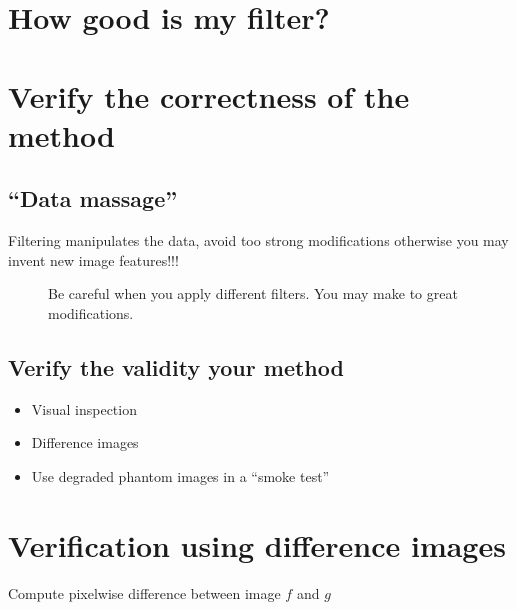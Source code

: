 \documentclass[letterpaper,10pt,english]{sphinxmanual}
\begin{document}
\section{How good is my filter?}
\label{\detokenize{02-ImageEnhancement:how-good-is-my-filter}}

\section{Verify the correctness of the method}
\label{\detokenize{02-ImageEnhancement:verify-the-correctness-of-the-method}}

\subsection{“Data massage”}
\label{\detokenize{02-ImageEnhancement:data-massage}}
\sphinxAtStartPar
Filtering manipulates the data, avoid too strong modifications otherwise you may invent new image features!!!

\begin{figure}[htbp]
\centering
\capstart

\noindent{}
\caption{Be careful when you apply different filters. You may make to great modifications.}\label{\detokenize{02-ImageEnhancement:id30}}\end{figure}




\subsection{Verify the validity your method}
\label{\detokenize{02-ImageEnhancement:verify-the-validity-your-method}}\begin{itemize}
\item {} 
\sphinxAtStartPar
Visual inspection

\item {} 
\sphinxAtStartPar
Difference images

\item {} 
\sphinxAtStartPar
Use degraded phantom images in a “smoke test”

\end{itemize}


\section{Verification using difference images}
\label{\detokenize{02-ImageEnhancement:verification-using-difference-images}}
\sphinxAtStartPar
Compute pixel\sphinxhyphen{}wise difference between image \(f\) and \(g\)
\end{document}
